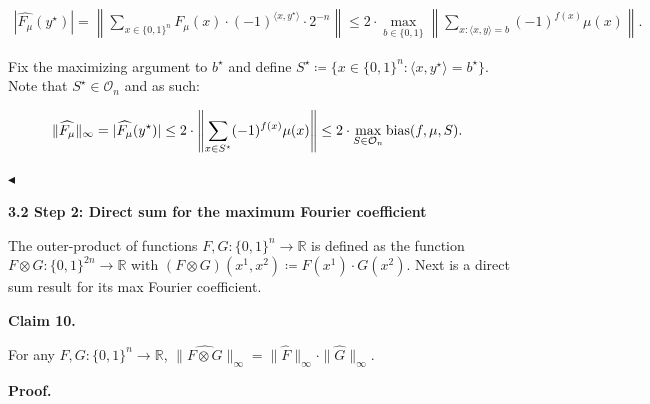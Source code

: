 \[\begin{gathered}
\displaystyle|\widehat{F_{\mu}}(y^{\star})|=\left\|\sum_{x\in\{0,1\}^{n}}F_{\mu}(x)\cdot(-1)^{\langle x,y^{\star}\rangle}\cdot 2^{-n}\right\|\leq 2\cdot\max_{b\in\{0,1\}}\left\|\sum_{x:\langle x,y\rangle=b}(-1)^{f(x)}\mu(x)\right\|.
\end{gathered}\]


Fix the maximizing argument to $b^{\star}$ and define $S^{\star}\coloneqq\{x\in\{0,1\}^{n}:\langle x,y^{\star}\rangle=b^{\star}\}$. Note that $S^{\star}\in\mathcal{O}_{n}$ and as such:\par


\[\begin{gathered}
\|\widehat{F_{\mu}}\|_{\infty}=|\widehat{F_{\mu}}(y^{\star})|\leq 2\cdot\left\|\sum_{x\in S^{\star}}(-1)^{f(x)}\mu(x)\right\|\leq 2\cdot\max_{S\in\mathcal{O}_{n}}{\textup{bias}}(f,\mu,S).\
\end{gathered}\]


$\blacktriangleleft$\par







\par\medskip\noindent\textbf{
3.2 Step 2: Direct sum for the maximum Fourier coefficient}\par




The outer-product of functions $F,G:\{0,1\}^{n}\to\mathbb{R}$ is defined as the function $F\otimes G:\{0,1\}^{2n}\to\mathbb{R}$ with $(F\otimes G)(x^{1},x^{2})\coloneqq F(x^{1})\cdot G(x^{2})$. Next is a direct sum result for its max Fourier coefficient.\par





\par\medskip\noindent\textbf{
Claim 10. 
}\par



For any $F,G:\{0,1\}^{n}\to\mathbb{R}$, $\|\widehat{F\otimes G}\|_{\infty}=\|\widehat{F}\|_{\infty}\cdot\|\widehat{G}\|_{\infty}$.\par






\par\medskip\noindent\textbf{
\textbf{Proof}.}\par




